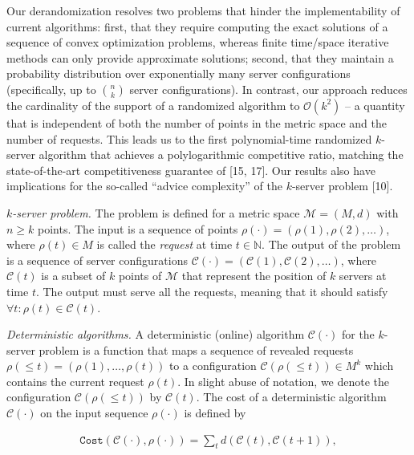 Our derandomization resolves two problems that hinder the implementability of current algorithms: first, that they require computing the exact solutions of a sequence of convex optimization problems, whereas finite time/space iterative methods can only provide approximate solutions; second, that they maintain a probability distribution over exponentially many server configurations (specifically, up to $\binom{n}{k}$ server configurations). In contrast, our approach reduces the cardinality of the support of a randomized algorithm to $\mathcal{O}(k^{2})$ – a quantity that is independent of both the number of points in the metric space and the number of requests.
This leads us to the first polynomial-time randomized $k$-server algorithm that achieves a polylogarithmic competitive ratio, matching the state-of-the-art competitiveness guarantee of [15, 17]. Our results also have implications for the so-called “advice complexity” of the $k$-server problem [10].\par




$k$\emph{-server problem.} The problem is defined for a metric space $\mathcal{M}=(M,d)$ with $n\geq k$ points. The input is a sequence of points $\rho(\cdot)=(\rho(1),\rho(2),\dots)$, where $\rho(t)\in M$ is called the \emph{request} at time $t\in\mathbb{N}$. The output of the problem is a sequence of server configurations $\mathcal{C}(\cdot)=(\mathcal{C}(1),\mathcal{C}(2),\dots)$, where $\mathcal{C}(t)$ is a subset of $k$ points of $\mathcal{M}$ that represent the position of $k$ servers at time $t$. The output must serve all the requests, meaning that it should satisfy $\forall t\colon\rho(t)\in\mathcal{C}(t)$.\par




\emph{Deterministic algorithms.} A deterministic (online) algorithm $\mathcal{C}(\cdot)$ for the $k$-server problem is a function that maps a sequence of revealed requests $\rho(\leq t)=(\rho(1),\dots,\rho(t))$ to a configuration $\mathcal{C}(\rho(\leq t))\in M^{k}$ which contains the current request $\rho(t)$. In slight abuse of notation, we denote the configuration $\mathcal{C}(\rho(\leq t))$ by $\mathcal{C}(t)$. The cost of a deterministic algorithm $\mathcal{C}(\cdot)$ on the input sequence $\rho(\cdot)$ is defined by\par


\[\begin{gathered}
{\texttt{Cost}}(\mathcal{C}(\cdot),\rho(\cdot))=\sum_{t}d(\mathcal{C}(t),\mathcal{C}(t+1)),
\end{gathered}\]


